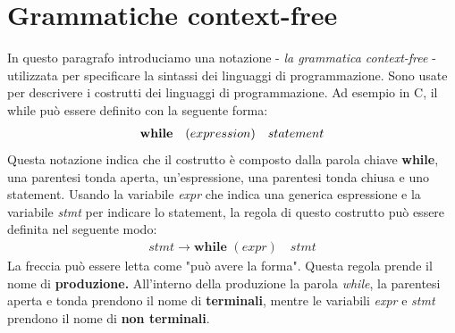 \section{Grammatiche context-free}
In questo paragrafo introduciamo una notazione - \textit{la grammatica context-free} - utilizzata per specificare la sintassi dei linguaggi di programmazione. Sono usate per descrivere i costrutti dei linguaggi di programmazione. Ad esempio in C, il while può essere definito con la seguente forma:
\begin{align}
	\textbf{while} \quad (expression) \quad statement \notag
\end{align}
Questa notazione indica che il costrutto è composto dalla parola chiave \textbf{while}, una parentesi tonda aperta, un'espressione, una parentesi tonda chiusa e uno statement. Usando la variabile \textit{expr} che indica una generica espressione e la variabile \textit{stmt} per indicare lo statement, la regola di questo costrutto può essere definita nel seguente modo:
\begin{align}\label{regolaWhile}
	stmt \to \textbf{while } ( expr ) \quad stmt 
\end{align}
La freccia può essere letta come "può avere la forma". Questa regola prende il nome di \textbf{produzione. }All'interno della produzione la parola \textit{while}, la parentesi aperta e tonda prendono il nome di \textbf{terminali}, mentre le variabili \textit{expr} e \textit{stmt} prendono il nome di \textbf{non terminali}.
